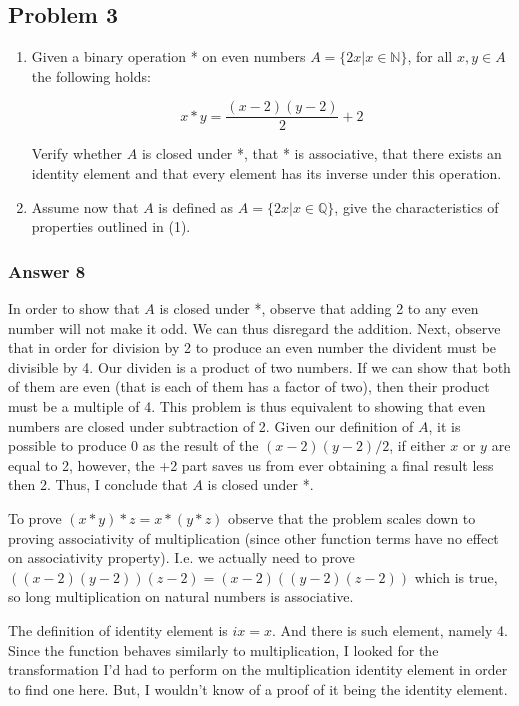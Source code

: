 \documentclass[11pt]{article}
\begin{document}
\subsection{Problem 3}
\label{sec-1-3}
\begin{enumerate}
\item Given a binary operation * on even numbers $A = \{2x | x \in \mathbb{N}\}$, for
all $x, y \in A$ the following holds:

\begin{equation}
x * y = \frac{(x - 2)(y - 2)}{2} + 2
\end{equation}

Verify whether $A$ is closed under *, that * is associative, that there exists
an identity element and that every element has its inverse under this operation.
\item Assume now that $A$ is defined as $A = \{2x | x \in \mathbb{Q}\}$, give the 
characteristics of properties outlined in (1).
\end{enumerate}

\subsubsection{Answer 8}
\label{sec-1-3-1}
In order to show that $A$ is closed under *, observe that adding 2 to any
even number will not make it odd.  We can thus disregard the addition.
Next, observe that in order for division by 2 to produce an even number the
divident must be divisible by 4.  Our dividen is a product of two numbers.
If we can show that both of them are even (that is each of them has a factor
of two), then their product must be a multiple of 4.  This problem is thus
equivalent to showing that even numbers are closed under subtraction of 2.
Given our definition of $A$, it is possible to produce 0 as the result of
the $(x - 2)(y - 2)/2$, if either $x$ or $y$ are equal to 2, however, the +2
part saves us from ever obtaining a final result less then 2.  Thus, I
conclude that $A$ is closed under *.

To prove $(x * y) * z = x * (y * z)$ observe that the problem scales down to
proving associativity of multiplication (since other function terms have no effect
on associativity property).  I.e. we actually need to prove
$((x - 2)(y - 2))(z - 2) = (x - 2)((y - 2)(z - 2))$ which is true, so long
multiplication on natural numbers is associative.

The definition of identity element is $ix = x$. And there is such element,
namely 4.  Since the function behaves similarly to multiplication, I looked
for the transformation I'd had to perform on the multiplication identity
element in order to find one here.  But, I wouldn't know of a proof of it
being the identity element.
\end{document}
